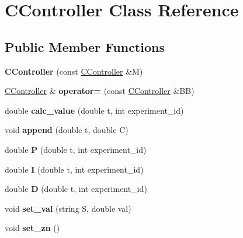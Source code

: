 \hypertarget{class_c_controller}{}\section{C\+Controller Class Reference}
\label{class_c_controller}
\subsection*{Public Member Functions}
\begin{DoxyCompactItemize}
\item 
\mbox{\label{class_c_controller_a10b9908dd6d736572c7a08c3d435f551}} 
{\bfseries C\+Controller} (const \hyperlink{class_c_controller}{C\+Controller} \&M)
\item 
\mbox{\label{class_c_controller_ae2331f62d9ce269d39825728483b1a12}} 
\hyperlink{class_c_controller}{C\+Controller} \& {\bfseries operator=} (const \hyperlink{class_c_controller}{C\+Controller} \&BB)
\item 
\mbox{\label{class_c_controller_a78945b236f0efb67f54d061ddc6ca36e}} 
double {\bfseries calc\+\_\+value} (double t, int experiment\+\_\+id)
\item 
\mbox{\label{class_c_controller_a865ba40e1c6ee7c63182d6a43b6498f7}} 
void {\bfseries append} (double t, double C)
\item 
\mbox{\label{class_c_controller_a26e0cfe180287501808183b2dd44c9fb}} 
double {\bfseries P} (double t, int experiment\+\_\+id)
\item 
\mbox{\label{class_c_controller_ad7e18de6c04e96d6fd00c21b641adaee}} 
double {\bfseries I} (double t, int experiment\+\_\+id)
\item 
\mbox{\label{class_c_controller_afe696331bf43c93c8ca918e1f3d95eb5}} 
double {\bfseries D} (double t, int experiment\+\_\+id)
\item 
\mbox{\label{class_c_controller_a266e57f698512f236134fd1700e058d2}} 
void {\bfseries set\+\_\+val} (string S, double val)
\item 
\mbox{\label{class_c_controller_aeffa1db55135b0c1c8489d4205fa07e4}} 
void {\bfseries set\+\_\+zn} ()
\end{DoxyCompactItemize}
